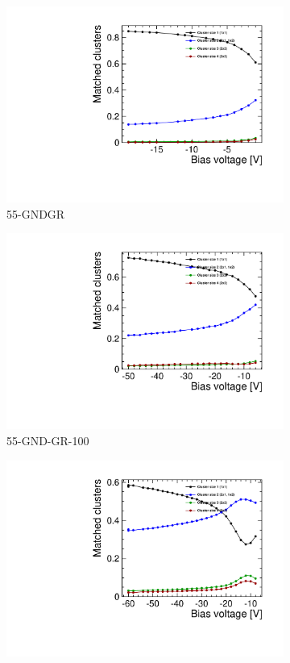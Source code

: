\begin{figure}[htbp]
  \begin{subfigure}[b]{0.33\textwidth}
    \includegraphics[width=\textwidth]{./figures/TestBeam/cluSize_bias_W0019_C07.pdf}
    \caption{55-GNDGR}
  \end{subfigure} \hfill
  \begin{subfigure}[b]{0.33\textwidth}
    \includegraphics[width=\textwidth]{./figures/TestBeam/cluSize_bias_W0005_E02.pdf}
    \caption{55-GND-GR-100}
  \end{subfigure}\hfill
  \begin{subfigure}[b]{0.33\textwidth}
    \includegraphics[width=\textwidth]{./figures/TestBeam/cluSize_bias_W0005_F01.pdf}

\end{subfigure}
\end{figure}
